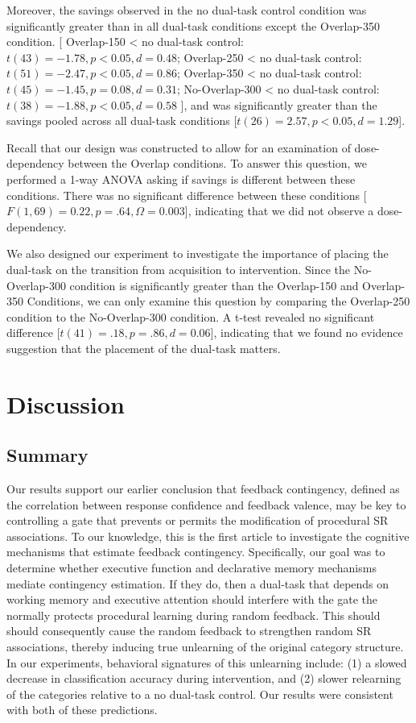 \documentclass[apacite,draftfirst,man]{apa6}
\begin{document}
Moreover, the savings observed in the no dual-task control condition was
significantly greater than in all dual-task conditions except the Overlap-350
condition.
[
Overlap-150 < no dual-task control: $t(43) = -1.78, p < 0.05, d = 0.48$;
Overlap-250 < no dual-task control: $t(51) = -2.47, p < 0.05, d = 0.86$;
Overlap-350 < no dual-task control: $t(45) = -1.45, p = 0.08, d = 0.31$;
No-Overlap-300 < no dual-task control: $t(38) = -1.88, p < 0.05, d = 0.58$
], and was significantly greater than the savings pooled across all dual-task
conditions [$t(26) = 2.57, p < 0.05, d = 1.29$].

Recall that our design was constructed to allow for an examination of
dose-dependency between the Overlap conditions. To answer this question, we
performed a 1-way ANOVA asking if savings is different between these conditions.
There was no significant difference between these conditions [$F(1,69) = 0.22, p
= .64, \Omega = 0.003$], indicating that we did not observe a dose-dependency.

We also designed our experiment to investigate the importance of placing the
dual-task on the transition from acquisition to intervention. Since the
No-Overlap-300 condition is significantly greater than the Overlap-150 and
Overlap-350 Conditions, we can only examine this question by comparing the
Overlap-250 condition to the No-Overlap-300 condition. A t-test revealed no
significant difference [$t(41) = .18, p = .86, d = 0.06$], indicating that we
found no evidence suggestion that the placement of the dual-task matters.

\section*{Discussion}
\subsection*{Summary}
Our results support our earlier conclusion \cite{crossley_erasing_2013} that
feedback contingency, defined as the correlation between response confidence and
feedback valence, may be key to controlling a gate that prevents or permits the
modification of procedural SR associations. To our knowledge, this is the first
article to investigate the cognitive mechanisms that estimate feedback
contingency. Specifically, our goal was to determine whether executive function
and declarative memory mechanisms mediate contingency estimation. If they do,
then a dual-task that depends on working memory and executive attention should
interfere with the gate the normally protects procedural learning during random
feedback. This should should consequently cause the random feedback to
strengthen random SR associations, thereby inducing true unlearning of the
original category structure. In our experiments, behavioral signatures of this
unlearning include: (1) a slowed decrease in classification accuracy during
intervention, and (2) slower relearning of the categories relative to a no
dual-task control. Our results were consistent with both of these predictions.
\end{document}
